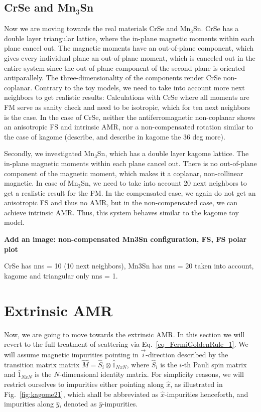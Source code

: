 \documentclass[prb,showpacs,amsmath,amssymb,superscriptaddress,twocolumn,floatfix]{revtex4-1}
\begin{document}
\subsection{CrSe and Mn$_3$Sn}
Now we are moving towards the real materials CrSe and Mn$_3$Sn. CrSe has a double layer triangular lattice, where the in-plane magnetic moments within each plane cancel out. The magnetic moments have an out-of-plane component, which gives every individual plane an out-of-plane moment, which is canceled out in the entire system since the out-of-plane component of the second plane is oriented antiparallely. The three-dimensionality of the components render CrSe non-coplanar. {\color{red} Contrary to the toy models, we need to take into account more next neighbors to get realistic results: Calculations with CrSe where all moments are FM serve as sanity check and need to be isotropic, which for ten next neighbors is the case}. In the case of CrSe, neither the antiferromagnetic non-coplanar shows an anisotropic FS and intrinsic AMR, nor a non-compensated rotation similar to the case of kagome {\color{red} (describe, and describe in kagome the 36 deg more)}.

Secondly, we investigated Mn$_3$Sn, which has a double layer kagome lattice. The in-plane magnetic moments within each plane cancel out. There is no out-of-plane component of the magnetic moment, which makes it a coplanar, non-collinear magnetic. {\color{red} In case of Mn$_3$Sn, we need to take into account 20 next neighbors to get a realistic result for the FM.} In the compensated case, we again do not get an anisotropic FS and thus no AMR, but in the non-compensated case, we can achieve intrinsic AMR. Thus, this system behaves similar to the kagome toy model.

{\color{red} \textbf{Add an image: non-compensated Mn3Sn configuration, FS, FS polar plot}
}

{\color{red} CrSe has nns = 10 (10 next neighbors), Mn3Sn has nns = 20 taken into account, kagome and triangular only nns = 1. } 

\section{Extrinsic AMR}
\label{sec_extrinsic}

Now, we are going to move towards the extrinsic AMR. In this section we will revert to the full treatment of scattering via Eq.~\ref{eq_FermiGoldenRule_1}. We will assume magnetic impurities pointing in $\vec{i}$-direction described by the transition matrix matrix $\hat{M} = \hat{S}_i \otimes \hat{1}_{NxN}$, where $\hat{S}_i$ is the $i$-th Pauli spin matrix and $\hat{1}_{NxN}$ is the $N$-dimensional identity matrix. For simplicity reasons, we will restrict ourselves to impurities either pointing along $\hat{x}$, as illustrated in Fig.~\ref{fig:kagome21}, which shall be abbreviated as $\hat{x}$-impurities henceforth, and impurities along $\hat{y}$, denoted as $\hat{y}$-impurities.
\end{document}
